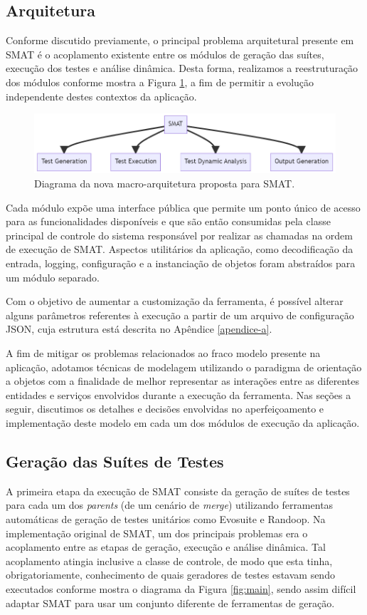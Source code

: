 \documentclass[12pt]{article}
\begin{document}
\subsection{Arquitetura}
Conforme discutido previamente, o principal problema arquitetural presente em SMAT é o acoplamento existente entre os módulos de geração das suítes, execução dos testes e análise dinâmica. Desta forma, realizamos a reestruturação dos módulos conforme mostra a Figura \ref{fig:macro}, a fim de permitir a evolução independente destes contextos da aplicação.

\begin{figure}[H]
    \centering
    \includegraphics[width=\textwidth]{imagens/macro.png}
    \caption{Diagrama da nova macro-arquitetura proposta para SMAT.}
    \label{fig:macro}
\end{figure}

Cada módulo expõe uma interface pública que permite um ponto único de acesso para as funcionalidades disponíveis e que são então consumidas pela classe principal de controle do sistema responsável por realizar as chamadas na ordem de execução de SMAT. Aspectos utilitários da aplicação, como decodificação da entrada, logging, configuração e a instanciação de objetos foram abstraídos para um módulo separado.

Com o objetivo de aumentar a customização da ferramenta, é possível alterar alguns parâmetros referentes à execução a partir de um arquivo de configuração JSON, cuja estrutura está descrita no Apêndice \ref{apendice-a}.

A fim de mitigar os problemas relacionados ao fraco modelo presente na aplicação, adotamos técnicas de modelagem utilizando o paradigma de orientação a objetos com a finalidade de melhor representar as interações entre as diferentes entidades e serviços envolvidos durante a execução da ferramenta. Nas seções a seguir, discutimos os detalhes e decisões envolvidas no aperfeiçoamento e implementação deste modelo em cada um dos módulos de execução da aplicação.

\subsection{Geração das Suítes de Testes}
A primeira etapa da execução de SMAT consiste da geração de suítes de testes para cada um dos \textit{parents} (de um cenário de \textit{merge}) utilizando ferramentas automáticas de geração de testes unitários como Evosuite e Randoop. Na implementação original de SMAT, um dos principais problemas era o acoplamento entre as etapas de geração, execução e análise dinâmica. Tal acoplamento atingia inclusive a classe de controle, de modo que esta tinha, obrigatoriamente, conhecimento de quais geradores de testes estavam sendo executados conforme mostra o diagrama da Figura \ref{fig:main}, sendo assim difícil adaptar SMAT para usar um conjunto diferente de ferramentas de geração.
\end{document}
